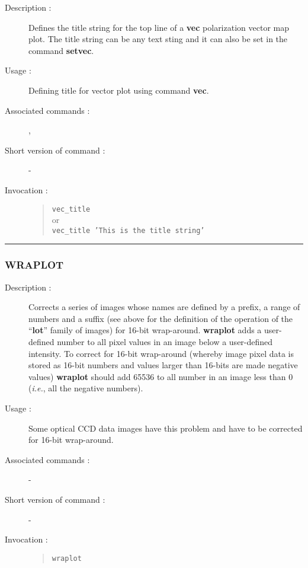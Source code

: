 \begin{description}

\item[Description :] Defines the title string for the top line of a {\bf vec}
polarization vector map plot.  The title string can be any text sting
and it can also be set in the command {\bf setvec}.

\item[Usage :] Defining title for vector plot using command {\bf vec}.
\item[Associated commands :] {\tt {}}, 
{\tt {}}
\item[Short version of command :] -
\item[Invocation :]

\begin{quote}{\tt  vec\_title }\\
or \\
{\tt vec\_title 'This is the title string' }
\end{quote}

\end{description}

\hrule 
\subsubsection*{\label{WRAPLOT}WRAPLOT}

\begin{description}

\item[Description :] Corrects a series of images whose names are
defined by a prefix, a range of numbers and a suffix (see above for the
definition of the operation of the ``{\bf lot}'' family of images) for
16-bit wrap-around.  {\bf wraplot} adds a user-defined number to all pixel
values in an image below a user-defined intensity.  To correct for
16-bit wrap-around (whereby image pixel data is stored as 16-bit
numbers and values larger than 16-bits are made negative values)
{\bf wraplot} should add 65536 to all number in an image less than 0
(\emph{i.e.}, all the negative numbers).

\item[Usage :] Some optical CCD data images have this problem and have to be
corrected for 16-bit wrap-around.
\item[Associated commands :] -
\item[Short version of command :] -
\item[Invocation :]

\begin{quote}{\tt  wraplot }\end{quote}

\end{description}

